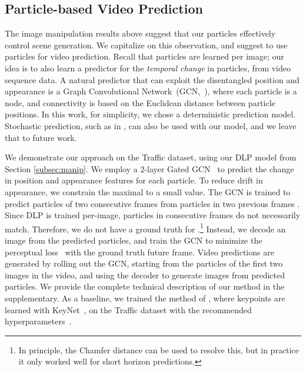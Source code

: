 \documentclass[nohyperref]{article}
\theoremstyle{plain}
\theoremstyle{definition}
\theoremstyle{remark}
\begin{document}
\subsection{Particle-based Video Prediction}
\label{sec:video}
The image manipulation results above suggest that our particles effectively control scene generation. We capitalize on this observation, and suggest to use particles for video prediction. Recall that particles are learned per image; our idea is to also learn a predictor for the \textit{temporal change} in particles, from video sequence data. A natural predictor that can exploit the disentangled position and appearance is a Graph Convolutional Network~(GCN,~\citealt{kipf2016gcn}), where each particle is a node, and connectivity is based on the Euclidean distance between particle positions. 
In this work, for simplicity, we chose a deterministic prediction model. Stochastic prediction, such as in \citet{minderer2019unsupervised}, can also be used with our model, and we leave that to future work.



We demonstrate our approach on the Traffic dataset, using our DLP model from Section \ref{subsec:manip}. We employ a 2-layer Gated GCN~\citep{bresson2017gatedgcn}
to predict the change in position  and appearance features  for each particle. To reduce drift in appearance, we constrain the maximal  to a small value. The GCN is trained to predict particles of two consecutive frames  from particles in two previous frames . 
Since DLP is trained per-image, particles in consecutive frames do not necessarily match. Therefore, we do not have a ground truth for .\footnote{In principle, the Chamfer distance can be used to resolve this, but in practice it only worked well for short horizon predictions.} Instead, we decode an image from the predicted particles, and train the GCN to minimize the perceptual loss~\citep{hoshen2019non} with the ground truth future frame. Video predictions are generated by rolling out the GCN, starting from the particles of the first two images in the video, and using the decoder to generate images from predicted particles. We provide the complete technical description of our method in the supplementary.
As a baseline, we trained the method of \citet{minderer2019unsupervised}, where keypoints are learned with KeyNet~\citep{jakab2018unsupervised}, on the Traffic dataset with the recommended hyperparameters~\citep{minderer19code}.
\end{document}

